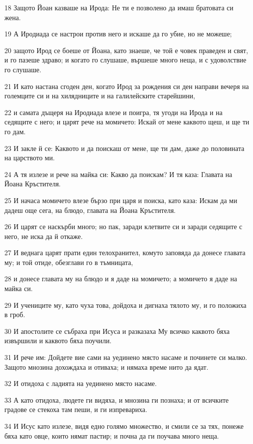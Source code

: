 \par 18 Защото Йоан казваше на Ирода: Не ти е позволено да имаш братовата си жена.
\par 19 А Иродиада се настрои против него и искаше да го убие, но не можеше;
\par 20 защото Ирод се боеше от Йоана, като знаеше, че той е човек праведен и свят, и го пазеше здраво; и когато го слушаше, вършеше много неща, и с удоволствие го слушаше.
\par 21 И като настана сгоден ден, когато Ирод за рождения си ден направи вечеря на големците си и на хилядниците и на галилейските старейшини,
\par 22 и самата дъщеря на Иродиада влезе и поигра, тя угоди на Ирода и на седящите с него; и царят рече на момичето: Искай от мене каквото щеш, и ще ти го дам.
\par 23 И закле й се: Каквото и да поискаш от мене, ще ти дам, даже до половината на царството ми.
\par 24 А тя излезе и рече на майка си: Какво да поискам? И тя каза: Главата на Йоана Кръстителя.
\par 25 И начаса момичето влезе бързо при царя и поиска, като каза: Искам да ми дадеш още сега, на блюдо, главата на Йоана Кръстителя.
\par 26 И царят се наскърби много; но пак, заради клетвите си и заради седящите с него, не иска да й откаже.
\par 27 И веднага царят прати един телохранител, комуто заповяда да донесе главата му; и той отиде, обезглави го в тъмницата,
\par 28 и донесе главата му на блюдо и я даде на момичето; а момичето я даде на майка си.
\par 29 И учениците му, като чуха това, дойдоха и дигнаха тялото му, и го положиха в гроб.
\par 30 И апостолите се събраха при Исуса и разказаха Му всичко каквото бяха извършили и каквото бяха поучили.
\par 31 И рече им: Дойдете вие сами на уединено място насаме и починете си малко. Защото мнозина дохождаха и отиваха; и нямаха време нито да ядат.
\par 32 И отидоха с ладията на уединено място насаме.
\par 33 А като отидоха, людете ги видяха, и мнозина ги познаха; и от всичките градове се стекоха там пеши, и ги изпревариха.
\par 34 И Исус като излезе, видя едно голямо множество, и смили се за тях, понеже бяха като овце, които нямат пастир; и почна да ги поучава много неща.
